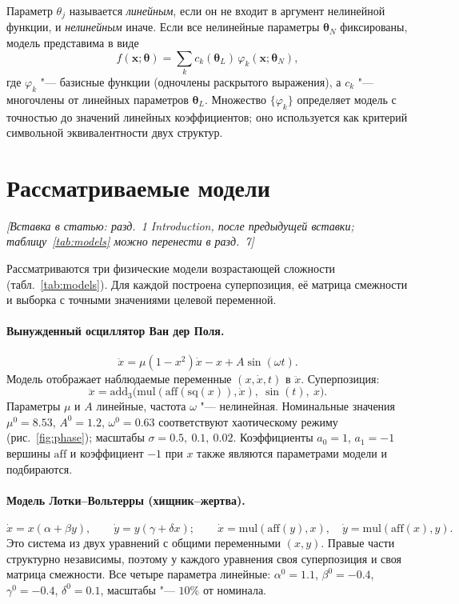 \documentclass[12pt]{article}
\newcommand{\where}[1]{\par\noindent\textit{[Вставка в статью: #1]}\par\smallskip}
\newcommand{\vx}{\mathbf{x}}
\newcommand{\tht}{\bm{\theta}}
\begin{document}
Параметр $\theta_j$ называется \emph{линейным}, если он не входит в аргумент нелинейной функции, и \emph{нелинейным} иначе. Если все нелинейные параметры $\tht_N$ фиксированы, модель представима в виде
\begin{equation}\label{eq:linearize}
f(\vx;\tht)=\sum_{k} c_k(\tht_L)\,\varphi_k(\vx;\tht_N),
\end{equation}
где $\varphi_k$ "--- базисные функции (одночлены раскрытого выражения), а $c_k$ "--- многочлены от линейных параметров $\tht_L$. Множество $\{\varphi_k\}$ определяет модель с точностью до значений линейных коэффициентов; оно используется как критерий символьной эквивалентности двух структур.

\section{Рассматриваемые модели}
\where{разд.~1 Introduction, после предыдущей вставки; таблицу~\ref{tab:models} можно перенести в разд.~7}

Рассматриваются три физические модели возрастающей сложности (табл.~\ref{tab:models}). Для каждой построена суперпозиция, её матрица смежности и выборка с точными значениями целевой переменной.

\paragraph{Вынужденный осциллятор Ван дер Поля.}
\[
\ddot x=\mu(1-x^2)\dot x-x+A\sin(\omega t).
\]
Модель отображает наблюдаемые переменные $(x,\dot x,t)$ в $\ddot x$. Суперпозиция:
\[
\ddot x=\mathrm{add}_3\bigl(\mathrm{mul}(\mathrm{aff}(\mathrm{sq}(x)),\dot x),\ \sin(t),\ x\bigr).
\]
Параметры $\mu$ и $A$ линейные, частота $\omega$ "--- нелинейная. Номинальные значения $\mu^0=8.53$, $A^0=1.2$, $\omega^0=0.63$ соответствуют хаотическому режиму (рис.~\ref{fig:phase}); масштабы $\sigma=0.5,\ 0.1,\ 0.02$. Коэффициенты $a_0=1$, $a_1=-1$ вершины $\mathrm{aff}$ и коэффициент $-1$ при $x$ также являются параметрами модели и подбираются.

\paragraph{Модель Лотки--Вольтерры (хищник--жертва).}
\[
\dot x=x(\alpha+\beta y),\qquad \dot y=y(\gamma+\delta x);\qquad
\dot x=\mathrm{mul}(\mathrm{aff}(y),x),\quad \dot y=\mathrm{mul}(\mathrm{aff}(x),y).
\]
Это система из двух уравнений с общими переменными $(x,y)$. Правые части структурно независимы, поэтому у каждого уравнения своя суперпозиция и своя матрица смежности. Все четыре параметра линейные: $\alpha^0=1.1$, $\beta^0=-0.4$, $\gamma^0=-0.4$, $\delta^0=0.1$, масштабы "--- $10\%$ от номинала.
\end{document}
